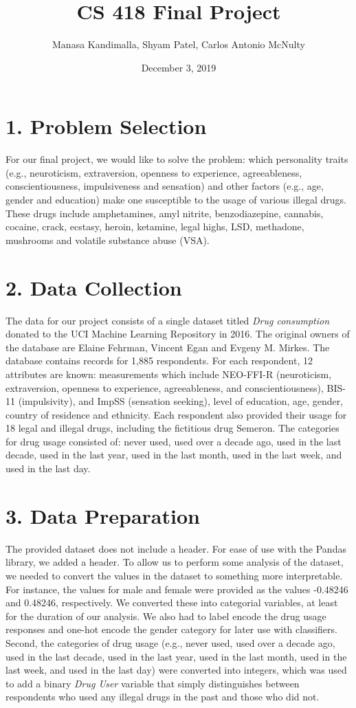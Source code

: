\documentclass[10pt]{article}
\title{CS 418 Final Project}
\date{December 3, 2019}
\author {Manasa Kandimalla, Shyam Patel, Carlos Antonio McNulty}
\begin{document}
\maketitle

\section*{1. Problem Selection}

For our final project, we would like to solve the problem: which personality traits (e.g., neuroticism, extraversion, openness to experience, agreeableness, conscientiousness, impulsiveness and sensation) and other factors (e.g., age, gender and education) make one susceptible to the usage of various illegal drugs. These drugs include amphetamines, amyl nitrite, benzodiazepine, cannabis, cocaine, crack, ecstasy, heroin, ketamine, legal highs, LSD, methadone, mushrooms and volatile substance abuse (VSA).


\section*{2. Data Collection}

The data for our project consists of a single dataset titled \textit{Drug consumption} donated to the UCI Machine Learning Repository in 2016. The original owners of the database are Elaine Fehrman, Vincent Egan and Evgeny M. Mirkes. The database contains records for 1,885 respondents. For each respondent, 12 attributes are known: measurements which include NEO-FFI-R (neuroticism, extraversion, openness to experience, agreeableness, and conscientiousness), BIS-11 (impulsivity), and ImpSS (sensation seeking), level of education, age, gender, country of residence and ethnicity. Each respondent also provided their usage for 18 legal and illegal drugs, including the fictitious drug Semeron. The categories for drug usage consisted of: never used, used over a decade ago, used in the last decade, used in the last year, used in the last month, used in the last week, and used in the last day.

\section*{3. Data Preparation}

The provided dataset does not include a header. For ease of use with the Pandas library, we added a header. To allow us to perform some analysis of the dataset, we needed to convert the values in the dataset to something more interpretable. For instance, the values for male and female were provided as the values -0.48246 and 0.48246, respectively. We converted these into categorial variables, at least for the duration of our analysis. We also had to label encode the drug usage responses and one-hot encode the gender category for later use with classifiers. Second, the categories of drug usage (e.g., never used, used over a decade ago, used in the last decade, used in the last year, used in the last month, used in the last week, and used in the last day) were converted into integers, which was used to add a binary \textit{Drug User} variable that simply distinguishes between respondents who used any illegal drugs in the past and those who did not.
\end{document}
